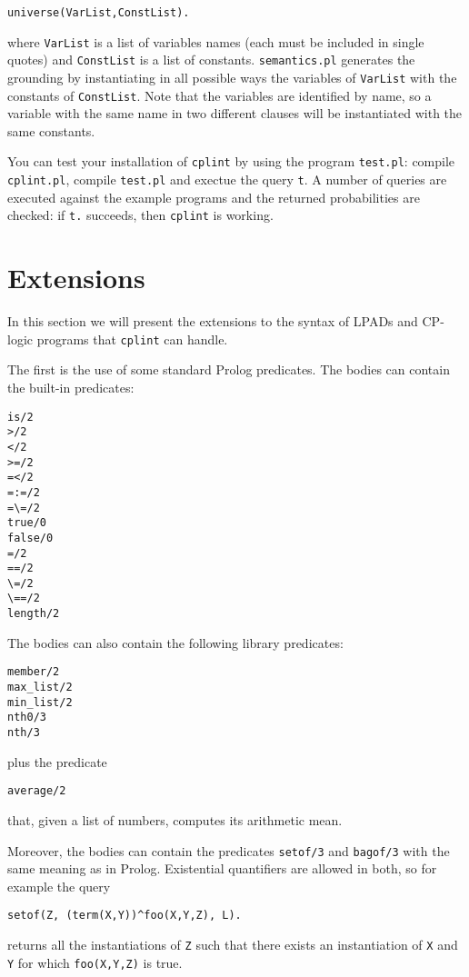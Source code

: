 \documentclass{article}
\begin{document}
\begin{verbatim}
universe(VarList,ConstList).
\end{verbatim}
where \texttt{VarList} is a list of variables names (each must be included in single quotes) and \texttt{ConstList} is a list of constants. \texttt{semantics.pl} generates the grounding by instantiating in all possible ways the variables of \texttt{VarList} with the constants of \texttt{ConstList}. Note that the variables are identified by name, so a variable with the same name in two different clauses will be instantiated with the same constants.

You can test your installation of \texttt{cplint} by using the program \texttt{test.pl}:
compile \texttt{cplint.pl}, compile \texttt{test.pl} and exectue the query \texttt{t}. 
A number of queries are executed against the example programs and the returned probabilities are checked: if \texttt{t.} succeeds, then \texttt{cplint} is working.


\section{Extensions}
In this section we will present the extensions to the syntax of LPADs and CP-logic programs that \texttt{cplint} can handle.

The first is the use of some standard Prolog predicates.
The bodies can contain the built-in predicates:
\begin{verbatim}
is/2
>/2
</2
>=/2
=</2
=:=/2
=\=/2
true/0
false/0
=/2
==/2
\=/2
\==/2
length/2
\end{verbatim}
The bodies can also contain the following
 library predicates:
\begin{verbatim}
member/2
max_list/2
min_list/2
nth0/3
nth/3
\end{verbatim}
plus the predicate
\begin{verbatim}
average/2
\end{verbatim}
that, given a list of numbers, computes its arithmetic mean.

Moreover, the bodies can contain the predicates \texttt{setof/3} and \texttt{bagof/3} with the same meaning as in Prolog. Existential quantifiers are allowed in both, so for example the query
\begin{verbatim}
setof(Z, (term(X,Y))^foo(X,Y,Z), L).
\end{verbatim}
returns all the instantiations of \texttt{Z} such that there exists an instantiation of \texttt{X} and \texttt{Y} for which \texttt{foo(X,Y,Z)} is true.
\end{document}
